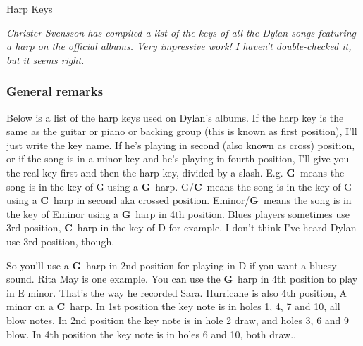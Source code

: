 
\thispagestyle{empty}
\label{harpkeys}

\vspace*{20ex}

\begin{flushright}{\Huge Harp Keys}\end{flushright}

\vspace{10ex}


\newcommand{\G}{\textcolor{G}{\textbf{G}}}
\newcommand{\A}{\textcolor{A}{\textbf{A}}}
\newcommand{\C}{\textcolor{C}{\textbf{C}}}
\newcommand{\D}{\textcolor{D}{\textbf{D}}}
\newcommand{\E}{\textcolor{E}{\textbf{E}}}

\noindent \textit{Christer Svensson has compiled a list of the keys of all
the Dylan songs featuring a harp on the official albums. Very impressive
work! I haven't double-checked it, but it seems right.}


\subsubsection*{General remarks}

Below is a list of the harp keys used on Dylan's albums. If the harp
key is the same as the guitar or piano or backing group (this is known
as first position), I'll just write the key name. If he's playing in
second (also known as cross) position, or if the song is in a minor
key and he's playing in fourth position, I'll give you the real
key first and then the harp key, divided by a slash. E.g. \G\ means
the song is in the key of G using a \G~harp. G/\C\ means the song is
in the key of G using a \C~harp in second aka crossed
position. Eminor/\G\ means the song is in the key of Eminor using a
\G~harp in 4th position. Blues players sometimes use 3rd position,
\C~harp in the key of D for example. I don't think I've heard Dylan use
3rd position, though.

So you'll use a \G~harp in 2nd position for playing in D if you want a
bluesy sound. Rita May is one example. You can use the \G~harp in
4th position to play in E minor. That's the way he recorded
Sara. Hurricane is also 4th position, A minor on a \C~harp. In
1st position the key note is in holes 1, 4, 7 and 10, all blow
notes. In 2nd position the key note is in hole 2 draw, and holes 3, 6
and 9 blow. In 4th position the key note is in holes 6 and 10, both
draw..



